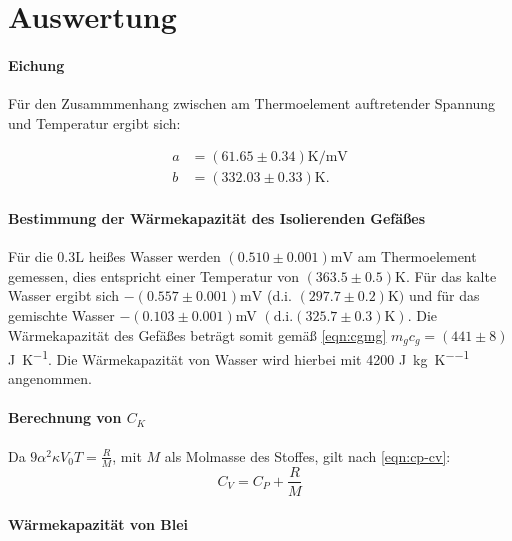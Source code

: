 \section{Auswertung}
\label{sec:Auswertung}
\paragraph{Eichung}
Für den Zusammmenhang zwischen am Thermoelement auftretender Spannung und Temperatur ergibt sich:

\begin{align*}
  a &= \left(61.65 \pm 0.34 \right) \si{\kelvin \per \milli \volt} \\
  b &= \left(332.03 \pm 0.33 \right) \si{\kelvin}.
\end{align*}

\paragraph{Bestimmung der Wärmekapazität des Isolierenden Gefäßes}
Für die $0.3 \si{\liter}$ heißes Wasser werden $(0.510 \pm 0.001) \si{\milli \volt}$
am Thermoelement gemessen, dies entspricht einer Temperatur von $(363.5 \pm 0.5) \si{\kelvin}$.
Für das kalte Wasser ergibt sich $-(0.557 \pm 0.001)\si{\milli \volt}$ (d.i. $(297.7 \pm 0.2)
\si{\kelvin})$ und für das gemischte Wasser  $ -(0.103 \pm 0.001)$\si{\milli\volt}
$(\text{d.i.} (325.7 \pm 0.3) \si{\kelvin})$. Die Wärmekapazität des Gefäßes beträgt somit
gemäß \eqref{eqn:cgmg} $m_gc_g = (441 \pm 8) $ \si{\joule \per \kelvin}.
Die Wärmekapazität von Wasser wird hierbei mit
4200 \si{\joule \per \kilo \gram \per \kelvin} \cite{Stoffwerte} angenommen.

\paragraph{Berechnung von \texorpdfstring{$C_K$}{math}}
Da $ 9 \alpha^{2} \kappa V_{0} T = \frac{R}{M} $, mit $M$ als Molmasse des Stoffes, gilt nach \eqref{eqn:cp-cv}:
\begin{equation}
  C_V = C_P + \frac{R}{M}
  \label{eqn:cr}
\end{equation}

\paragraph{Wärmekapazität von Blei}

